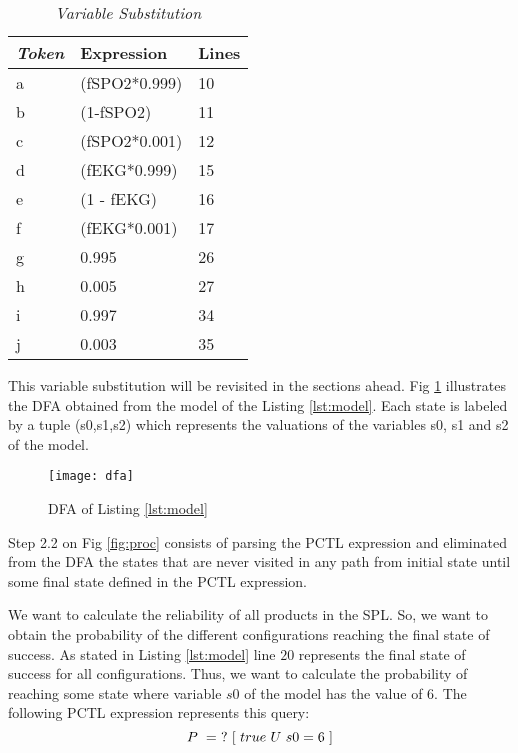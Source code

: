 \documentclass[conference]{IEEEtran}
\begin{document}
	\begin{table}[!h]
	\begin{center}
	\begin{tabular}{|l|l|l|}
	\hline
	\textit{\textbf{Token}} & \textbf{Expression} & \textbf{Lines}\\ \hline
	a &	(fSPO2*0.999)	&	10 \\ \hline
	b &	(1-fSPO2)	& 11	\\ \hline
	c &	(fSPO2*0.001)	&	12 \\ \hline
	d &	(fEKG*0.999)	&	15 \\ \hline
	e &	(1 - fEKG)	&	16 \\ \hline
	f &	(fEKG*0.001)	& 17	\\ \hline
	g &	0.995	& 26	\\ \hline
	h &	0.005	& 27	\\ \hline
	i &	0.997	& 34	\\ \hline
	j &	0.003	& 35	\\ \hline
	\end{tabular}
	\end{center}
	\caption{\textit{Variable Substitution}}
	\label{tb:variablesubstitution}
	\end{table}	
	
		
	This variable substitution will be revisited in the sections ahead.
	Fig \ref{fig:dfa} illustrates the DFA obtained from the model of the Listing \ref{lst:model}.
	Each state is labeled by a tuple (s0,s1,s2) which represents the valuations of the variables
	s0, s1 and s2 of the model.
	
	\begin{figure}[!h]
	\centering
	\texttt{[image: dfa]}	
	\caption{DFA of Listing \ref{lst:model}}
	\label{fig:dfa}
	\end{figure}
	
	
	Step 2.2 on Fig \ref{fig:proc} consists of parsing the PCTL
	expression and eliminated from the DFA the states that are never
	visited in any path from initial state until some final state
	defined in the PCTL expression.
	
	We want to calculate the reliability of all products in the SPL.
	So, we want to obtain the probability of the different configurations
	reaching the final state of success. As stated in Listing \ref{lst:model}
	 line $20$ represents the final state of success for all configurations.
	Thus, we want to calculate the probability of reaching some state where
	variable $s0$ of the model has the value of $6$. The following PCTL
	expression represents this query:	
	\begin{equation}
	\footnotesize
	P\ =\ ?\ [\ true\ U\ s0=6\ ]
	\end{equation}
	
\end{document}
